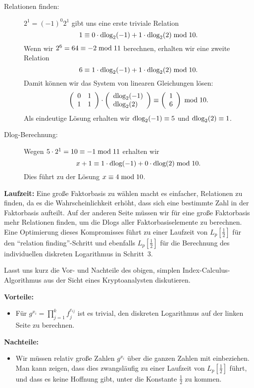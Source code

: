 \begin{refsegment}
\begin{description}
\item[Relationen finden:] $2^1 = (-1)^0 2^1$ gibt uns eine erste triviale Relation
$$
  1 \equiv 0 \cdot \textrm{dlog}_2(-1) + 1\cdot \textrm{dlog}_2(2) \hspace{1mm}{\rm mod}\hspace{1mm} 10.
$$
Wenn wir $2^6 = 64 \equiv -2 \hspace{1mm}{\rm mod}\hspace{1mm} 11$ berechnen, erhalten wir eine zweite Relation
$$
  6 \equiv 1\cdot \textrm{dlog}_2(-1) + 1 \cdot \textrm{dlog}_2(2) \hspace{1mm}{\rm mod}\hspace{1mm} 10.
$$
Damit können wir das System von linearen Gleichungen lösen:
$$
\left(
\begin{array}{ll}
0 & 1\\
1 & 1
\end{array}
\right)
\cdot
\left(
\begin{array}{l}
\dlog_2(-1)\\
\dlog_2(2)
\end{array}
\right)
%
\equiv
%
\left(
\begin{array}{l}
1\\
6
\end{array}
\right) \mmod 10.
$$
Als eindeutige Lösung erhalten wir $\textrm{dlog}_2(-1) \equiv 5$ und $\textrm{dlog}_2(2) \equiv 1$.

\item[Dlog-Berechnung:] Wegen $5 \cdot 2^{1} = 10 \equiv -1 \hspace{1mm}{\rm mod}\hspace{1mm} 11$ erhalten wir
$$
  x + 1 \equiv 1 \cdot \textrm{dlog}(-1) + 0 \cdot \textrm{dlog}(2) \hspace{1mm}{\rm mod}\hspace{1mm} 10.
$$
Dies führt zu der Lösung $x \equiv 4 \hspace{1mm}{\rm mod}\hspace{1mm} 10$.
\end{description}

\textbf{Laufzeit:}
Eine große Faktorbasis zu wählen macht es einfacher, Relationen zu finden, da es die Wahrscheinlichkeit erhöht, dass sich eine bestimmte Zahl in der Faktorbasis aufteilt. Auf der anderen Seite müssen wir für eine große Faktorbasis mehr Relationen finden, um die Dlogs aller Faktorbasiselemente zu berechnen. Eine Optimierung dieses Kompromisses führt zu einer Laufzeit von $L_p[\frac 1 2]$ für den "`relation finding"'-Schritt und ebenfalls $L_p[\frac 1 2]$ für die Berechnung des individuellen diskreten Logarithmus in Schritt~3.

Lasst uns kurz die Vor- und Nachteile des obigen, simplen Index-Calculus-Algorithmus aus der Sicht eines Kryptoanalysten diskutieren.

\textbf{Vorteile:}
\begin{itemize}
\item Für $g^{x_i} = \prod_{j=1}^k f_j^{e_{ij}}$ ist es trivial, den diskreten Logarithmus auf der linken Seite zu berechnen.
\end{itemize}

\textbf{Nachteile:}
\begin{itemize}
\item Wir müssen relativ große Zahlen $g^{x_i}$ über die ganzen Zahlen mit einbeziehen. Man kann zeigen, dass dies zwangsläufig zu einer Laufzeit von $L_p[\frac 1 2]$ führt, und dass es keine Hoffnung gibt, unter die Konstante $\frac 1 2$ zu kommen.
\DIFdelbegin %


\end{itemize}
\end{refsegment}
